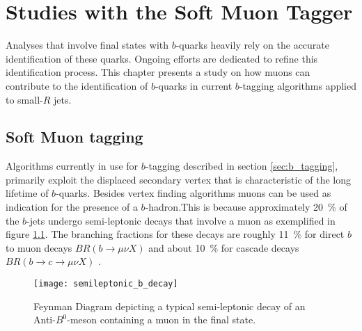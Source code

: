 \chapter{Studies with the Soft Muon Tagger}
Analyses that involve final states with $b$-quarks heavily rely on the accurate identification of these quarks. Ongoing efforts are dedicated to refine this identification process. This chapter presents a study on how muons can contribute to the identification of $b$-quarks in current $b$-tagging algorithms applied to small-$R$ jets. 


\section{Soft Muon tagging}
\label{sec:SoftMuonTagging}
Algorithms currently in use for $b$-tagging described in section \ref{sec:b_tagging}, primarily exploit the displaced secondary vertex that is characteristic of the long lifetime of $b$-quarks. Besides vertex finding algorithms muons can be used as indication for the presence of a $b$-hadron.This is because approximately \qty{20}{\percent} of the $b$-jets undergo semi-leptonic decays that involve a muon as exemplified in figure \ref{fig:semileptonicDecay}. The branching fractions for these decays are roughly \qty{11}{\percent} for direct $b$ to muon decays $BR( b \rightarrow \mu \nu X )$ and about \qty{10}{\percent} for cascade decays $BR( b \rightarrow c \rightarrow \mu \nu X )$ \citep{expectedPerformanceAtlas}.
\begin{figure}[htbp]
  \centering
  \texttt{[image: semileptonic\_b\_decay]}
  \caption{Feynman Diagram depicting a typical semi-leptonic decay of an Anti-$B^0$-meson containing a muon in the final state.}
  \label{fig:semileptonicDecay}
\end{figure}


